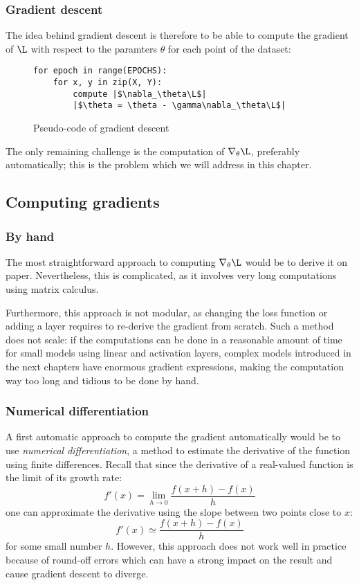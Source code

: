 \subsubsection{Gradient descent}
The idea behind gradient descent is therefore to be able to compute the gradient of $\L$ with respect to the paramters $\theta$ for each point of the dataset:
\begin{figure}[H]
    \centering 
    \begin{minipage}{0.4\textwidth}
    \begin{verbatim}
for epoch in range(EPOCHS):
    for x, y in zip(X, Y):
        compute |$\nabla_\theta\L$|
        |$\theta = \theta - \gamma\nabla_\theta\L$|
    \end{verbatim}
    \end{minipage}
    \caption{Pseudo-code of gradient descent}
\end{figure}
The only remaining challenge is the computation of $\nabla_\theta\L$, preferably automatically; this is the problem which we will address in this chapter.

\subsection{Computing gradients}
\subsubsection{By hand}
The most straightforward approach to computing $\nabla_\theta\L$ would be to derive it on paper. Nevertheless, this is complicated, as it involves very long computations using matrix calculus.

Furthermore, this approach is not modular, as changing the loss function or adding a layer requires to re-derive the gradient from scratch. Such a method does not scale: if the computations can be done in a reasonable amount of time for small models using linear and activation layers, complex models introduced in the next chapters have enormous gradient expressions, making the computation way too long and tidious to be done by hand.

\subsubsection{Numerical differentiation}
A first automatic approach to compute the gradient automatically would be to use \emph{numerical differentiation}, a method to estimate the derivative of the function using finite differences. Recall that since the derivative of a real-valued function is the limit of its growth rate:
\begin{equation*}
    f'(x) = \lim_{h\to0} \frac{f(x+h)-f(x)}{h}
\end{equation*}
one can approximate the derivative using the slope between two points close to $x$:
\begin{equation*}
    f'(x) \simeq \frac{f(x+h)-f(x)}{h}
\end{equation*}
for some small number $h$. However, this approach does not work well in practice because of round-off errors which can have a strong impact on the result and cause gradient descent to diverge.

